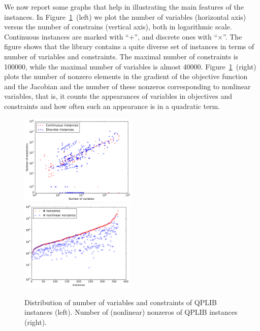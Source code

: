 We now report some graphs that help in illustrating the main features
of the instances. In Figure~\ref{fig:distribution}~(left) we plot the number
of variables (horizontal axis) versus the number of constrains
(vertical axis), both in logarithmic scale. Continuous instances are
marked with ``$+$'', and discrete ones with ``$\times$''. The figure shows
that the library contains a quite diverse set of instances in
terms of number of variables and constraints. The maximal number of constraints
is 100000, while the maximal number of
variables is almost 40000.
Figure~\ref{fig:distribution}~(right) plots the number of nonzero elements in the gradient of the objective function and the Jacobian and the number of these nonzeros corresponding to nonlinear variables, that is, it counts the appearances of variables in objectives and constraints and how often such an appearance is in a quadratic term.

\begin{figure}\centering
  \includegraphics[width=0.50\textwidth]{pic_overview.pdf}
  \includegraphics[width=0.49\textwidth]{pic_nz.pdf}
  \caption{Distribution of number of variables and constraints of QPLIB instances
(left). Number of (nonlinear) nonzeros of QPLIB instances (right).\label{fig:distribution}}
\end{figure}

